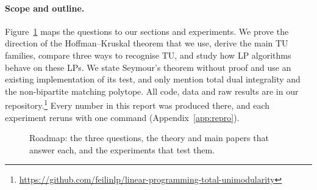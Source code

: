 \paragraph{Scope and outline.} Figure~\ref{fig:roadmap} maps the questions to our sections and experiments. We prove the direction of the Hoffman--Kruskal theorem that we use, derive the main TU families, compare three ways to recognise TU, and study how LP algorithms behave on these LPs. We state Seymour's theorem \cite{seymour1980} without proof and use an existing implementation of its test, and only mention total dual integrality and the non-bipartite matching polytope. All code, data and raw results are in our repository.\footnote{\url{https://github.com/feilinlp/linear-programming-total-unimodularity}} Every number in this report was produced there, and each experiment reruns with one command (Appendix~\ref{app:repro}).

\begin{figure}[H]
  \centering
  
  \caption{Roadmap: the three questions, the theory and main papers that answer each, and the experiments that test them.}
  \label{fig:roadmap}
\end{figure}
